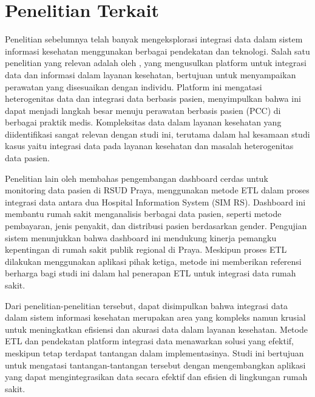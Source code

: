 \section{Penelitian Terkait}
\label{sec:penelitianterkait}

Penelitian sebelumnya telah banyak mengeksplorasi integrasi data dalam sistem informasi kesehatan menggunakan berbagai pendekatan dan teknologi. Salah satu penelitian yang relevan adalah oleh \citet{JAYARATNE2019996}, yang mengusulkan platform untuk integrasi data dan informasi dalam layanan kesehatan, bertujuan untuk menyampaikan perawatan yang disesuaikan dengan individu. Platform ini mengatasi heterogenitas data dan integrasi data berbasis pasien, menyimpulkan bahwa ini dapat menjadi langkah besar menuju perawatan berbasis pasien (PCC) di berbagai praktik medis. Kompleksitas data dalam layanan kesehatan yang diidentifikasi sangat relevan dengan studi ini, terutama dalam hal kesamaan studi kasus yaitu integrasi data pada layanan kesehatan dan masalah heterogenitas data pasien.

Penelitian lain oleh \citet{mutawalli2021pengembangan} membahas pengembangan dashboard cerdas untuk monitoring data pasien di RSUD Praya, menggunakan metode ETL dalam proses integrasi data antara dua Hospital Information System (SIM RS). Dashboard ini membantu rumah sakit menganalisis berbagai data pasien, seperti metode pembayaran, jenis penyakit, dan distribusi pasien berdasarkan gender. Pengujian sistem menunjukkan bahwa dashboard ini mendukung kinerja pemangku kepentingan di rumah sakit publik regional di Praya. Meskipun proses ETL dilakukan menggunakan aplikasi pihak ketiga, metode ini memberikan referensi berharga bagi studi ini dalam hal penerapan ETL untuk integrasi data rumah sakit.

Dari penelitian-penelitian tersebut, dapat disimpulkan bahwa integrasi data dalam sistem informasi kesehatan merupakan area yang kompleks namun krusial untuk meningkatkan efisiensi dan akurasi data dalam layanan kesehatan. Metode ETL dan pendekatan platform integrasi data menawarkan solusi yang efektif, meskipun tetap terdapat tantangan dalam implementasinya. Studi ini bertujuan untuk mengatasi tantangan-tantangan tersebut dengan mengembangkan aplikasi yang dapat mengintegrasikan data secara efektif dan efisien di lingkungan rumah sakit.

